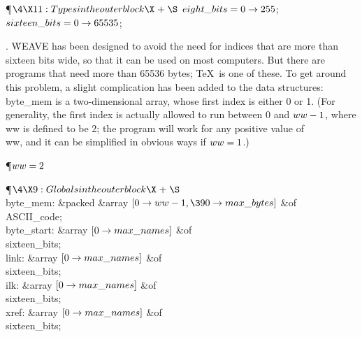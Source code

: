 \Y\P$\4\X11:Types in the outer block\X\mathrel{+}\S$\6
$\\{eight\_bits}=0\to255$;\6
$\\{sixteen\_bits}=0\to65535$;\par
\fi

. \.{WEAVE} has been designed to avoid the need for indices that are more
than sixteen bits wide, so that it can be used on most computers. But
there are programs that need more than 65536 bytes; \TeX\ is one of these.
To get around this problem, a slight complication has been added to the
data structures:  \\{byte\_mem} is a two-dimensional array, whose first index
is either 0 or 1. (For generality, the first index is actually allowed to
run between 0 and $\\{ww}-1$, where \\{ww} is defined to be 2; the program will
work for any positive value of \\{ww}, and it can be simplified in obvious
ways if $\\{ww}=1$.)

\Y\P\D {}$\\{ww}=2$\par
\Y\P$\4\X9:Globals in the outer block\X\mathrel{+}\S$\6
\4\\{byte\_mem}: \&{packed} \&{array} $[0\to\\{ww}-1,\390\to\\{max%
\_bytes}]$ \1\&{of}\5
\\{ASCII\_code};\2\6
\4\\{byte\_start}: \&{array} $[0\to\\{max\_names}]$ \1\&{of}\5
\\{sixteen\_bits};\2\6
\4\\{link}: \&{array} $[0\to\\{max\_names}]$ \1\&{of}\5
\\{sixteen\_bits};\2\6
\4\\{ilk}: \&{array} $[0\to\\{max\_names}]$ \1\&{of}\5
\\{sixteen\_bits};\2\6
\4\\{xref}: \&{array} $[0\to\\{max\_names}]$ \1\&{of}\5
\\{sixteen\_bits};\2\par
\fi

